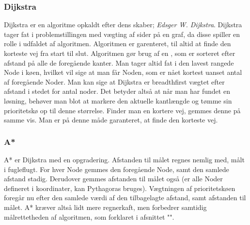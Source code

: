 \documentclass[a4paper, 12pt]{article}
\begin{document}
\subsubsection{Dijkstra}\label{subsubsec:dijk}
Dijkstra er en algoritme opkaldt efter dens skaber; \textit{Edsger W. Dijkstra}.\cite{dijkstra} Dijkstra tager fat i problemstillingen med vægting af sider på en graf, da disse spiller en rolle i udfaldet af algoritmen. Algoritmen er garenteret, til altid at finde den korteste vej fra start til slut. Algoritmen gør brug af en , som er sorteret efter afstand på alle de foregående kanter. Man tager altid fat i den lavest rangede Node i køen, hvilket vil sige at man får Noden, som er nået kortest uanset antal af foregående Noder. Man kan sige at Dijkstra er breadthfirst vægtet efter afstand i stedet for antal noder. Det betyder altså at når man har fundet en løsning, behøver man blot at markere den aktuelle kantlængde og tømme sin prioritetskø op til denne størrelse. Finder man en kortere vej, gemmes denne på samme vis. Man er på denne måde garanteret, at finde den korteste vej. \cite{algs}
\subsubsection{A*}
A* er Dijkstra med en opgradering. Afstanden til målet regnes nemlig med, målt i fugleflugt. For hver Node gemmes den foregående Node, samt den samlede afstand stadig. Derudover gemmes afstanden til målet også (er alle Noder defineret i koordinater, kan Pythagoras bruges). Vægtningen af prioritetskøen foregår nu efter den samlede værdi af den tilbagelagte afstand, samt afstanden til målet. A* kræver altså lidt mere regnerkaft, men forbedrer samtidig målrettetheden af algoritmen, som forklaret i afsnittet "".


\newpage
\end{document}
